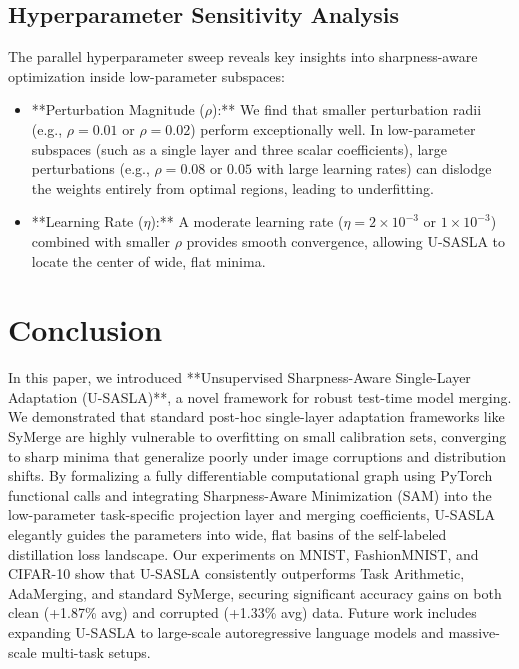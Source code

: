 \documentclass{article}
\theoremstyle{plain}
\theoremstyle{definition}
\theoremstyle{remark}
\begin{document}
\subsection{Hyperparameter Sensitivity Analysis}
The parallel hyperparameter sweep reveals key insights into sharpness-aware optimization inside low-parameter subspaces:
\begin{itemize}
    \item **Perturbation Magnitude ($\rho$):** We find that smaller perturbation radii (e.g., $\rho=0.01$ or $\rho=0.02$) perform exceptionally well. In low-parameter subspaces (such as a single layer and three scalar coefficients), large perturbations (e.g., $\rho=0.08$ or $0.05$ with large learning rates) can dislodge the weights entirely from optimal regions, leading to underfitting.
    \item **Learning Rate ($\eta$):** A moderate learning rate ($\eta = 2\times 10^{-3}$ or $1\times 10^{-3}$) combined with smaller $\rho$ provides smooth convergence, allowing U-SASLA to locate the center of wide, flat minima.
\end{itemize}

\section{Conclusion}
\label{conclusion}
In this paper, we introduced **Unsupervised Sharpness-Aware Single-Layer Adaptation (U-SASLA)**, a novel framework for robust test-time model merging. We demonstrated that standard post-hoc single-layer adaptation frameworks like SyMerge are highly vulnerable to overfitting on small calibration sets, converging to sharp minima that generalize poorly under image corruptions and distribution shifts. By formalizing a fully differentiable computational graph using PyTorch functional calls and integrating Sharpness-Aware Minimization (SAM) into the low-parameter task-specific projection layer and merging coefficients, U-SASLA elegantly guides the parameters into wide, flat basins of the self-labeled distillation loss landscape. Our experiments on MNIST, FashionMNIST, and CIFAR-10 show that U-SASLA consistently outperforms Task Arithmetic, AdaMerging, and standard SyMerge, securing significant accuracy gains on both clean (+1.87\% avg) and corrupted (+1.33\% avg) data. Future work includes expanding U-SASLA to large-scale autoregressive language models and massive-scale multi-task setups.



\end{document}
